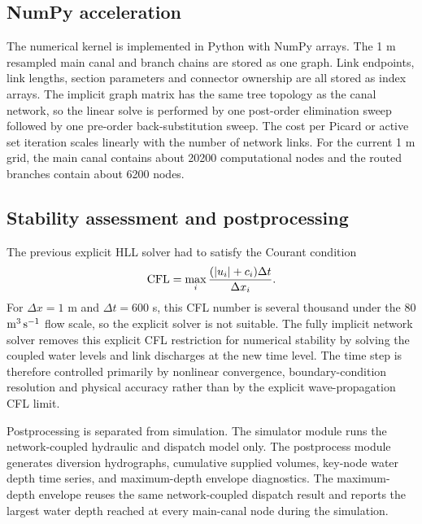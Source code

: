 \subsection{NumPy acceleration}

The numerical kernel is implemented in Python with NumPy arrays. The 1 m
resampled main canal and branch chains are stored as one graph. Link endpoints,
link lengths, section parameters and connector ownership are all stored as
index arrays. The implicit graph matrix has the same tree topology as the canal
network, so the linear solve is performed by one post-order elimination sweep
followed by one pre-order back-substitution sweep. The cost per Picard or active
set iteration scales linearly with the number of network links. For the current
1 m grid, the main canal contains about 20200 computational nodes and the routed
branches contain about 6200 nodes.

\subsection{Stability assessment and postprocessing}

The previous explicit HLL solver had to satisfy the Courant condition
\begin{equation}
    {\rm CFL}
    =
    \max_i
    \frac{(|u_i|+c_i)\Delta t}{\Delta x_i}.
\end{equation}
For \(\Delta x=1\) m and \(\Delta t=600\) s, this CFL number is several
thousand under the 80 \({\rm m^3\,s^{-1}}\) flow scale, so the explicit solver
is not suitable. The fully implicit network solver removes this explicit CFL
restriction for numerical stability by solving the coupled water levels and
link discharges at the new time level. The time step is therefore controlled
primarily by nonlinear convergence, boundary-condition resolution and physical
accuracy rather than by the explicit wave-propagation CFL limit.

Postprocessing is separated from simulation. The simulator module runs the
network-coupled hydraulic and dispatch model only. The postprocess module
generates diversion hydrographs, cumulative supplied volumes, key-node water
depth time series, and maximum-depth envelope diagnostics. The maximum-depth
envelope reuses the same network-coupled dispatch result and reports the largest
water depth reached at every main-canal node during the simulation.
